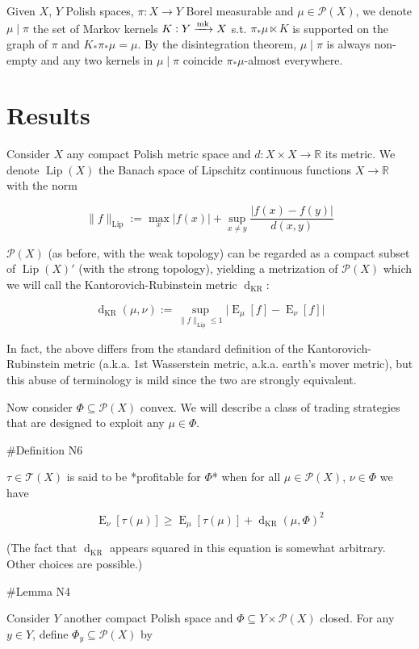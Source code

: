 \documentclass[a4paper]{article}
\DeclareMathOperator{\E}{E}
\newcommand{\Reals}{\mathbb{R}}
\newcommand{\Abs}[1]{\lvert #1 \rvert}
\newcommand{\Norm}[1]{\lVert #1 \rVert}
\newcommand{\Markov}{\xrightarrow{\textnormal{mk}}}
\newcommand{\Prob}{\mathcal{P}}
\newcommand{\T}{\mathcal{T}}
\newcommand{\Lip}{\operatorname{Lip}}
\newcommand{\NormL}[1]{\Norm{#1}_{\operatorname{Lip}}}
\newcommand{\Dkr}{\operatorname{d}_{\text{KR}}}
\begin{document}
Given ${X}$, ${Y}$ Polish spaces, ${\pi: X \rightarrow Y}$ Borel measurable and ${\mu \in \Prob(X)}$, we denote ${\mu \mid \pi}$ the set of Markov kernels ${K: Y \Markov X}$ s.t. ${\pi_* \mu \ltimes K}$ is supported on the graph of ${\pi}$ and ${K_*\pi_* \mu = \mu}$. By the disintegration theorem, ${\mu \mid \pi}$ is always non-empty and any two kernels in ${\mu \mid \pi}$ coincide ${\pi_*\mu}$-almost everywhere.

\section{Results}

Consider ${X}$ any compact Polish metric space and ${d: X \times X \rightarrow \Reals}$ its metric. We denote ${\Lip(X)}$ the Banach space of Lipschitz continuous functions ${X \rightarrow \Reals}$ with the norm

$$\NormL{f}:=\max_{x} \Abs{f(x)} + \sup_{x \ne y}\frac{\Abs{f(x)-f(y)}}{d(x,y)}$$

${\Prob(X)}$ (as before, with the weak topology) can be regarded as a compact subset of ${\Lip(X)'}$ (with the strong topology), yielding a metrization of ${\Prob(X)}$ which we will call the Kantorovich-Rubinstein metric ${\Dkr}$:

$$\Dkr(\mu,\nu):=\sup_{\NormL{f} \leq 1} \Abs{\E_\mu[f] - \E_\nu[f]}$$

In fact, the above differs from the standard definition of the Kantorovich-Rubinstein metric (a.k.a. 1st Wasserstein metric, a.k.a. earth's mover metric), but this abuse of terminology is mild since the two are strongly equivalent.

Now consider ${\Phi \subseteq \Prob(X)}$ convex. We will describe a class of trading strategies that are designed to exploit any ${\mu \in \Phi}$.

\#Definition N6

${\tau \in \T(X)}$ is said to be *profitable for ${\Phi}$* when for all ${\mu \in \Prob(X)}$, ${\nu \in \Phi}$ we have

$$\E_\nu[\tau(\mu)] \geq \E_\mu[\tau(\mu)] + \Dkr(\mu,\Phi)^2$$

(The fact that $\Dkr$ appears squared in this equation is somewhat arbitrary. Other choices are possible.)

\#Lemma N4

Consider ${Y}$ another compact Polish space and ${\Phi \subseteq Y \times \Prob(X)}$ closed. For any ${y \in Y}$, define ${\Phi_y \subseteq \Prob(X)}$ by
\end{document}
